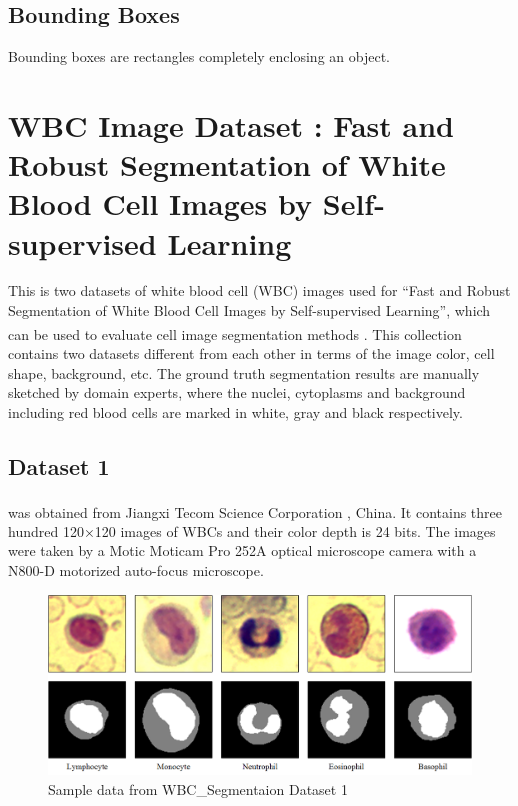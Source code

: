 \subsection{Bounding Boxes}
Bounding boxes are rectangles completely enclosing an object.

\newpage

\section{WBC Image Dataset : Fast and Robust Segmentation of White Blood Cell Images by Self-supervised Learning}
This is two datasets of white blood cell (WBC) images used for “Fast and Robust Segmentation of White Blood Cell Images by Self-supervised Learning”, which can be used to evaluate cell image segmentation methods \textsuperscript{\cite{Zheng2018}}.
This collection contains two datasets different from each other in terms of the image color, cell shape, background, etc. The ground truth segmentation results are manually sketched by domain experts, where the nuclei, cytoplasms and background including red blood cells are marked in white, gray and black respectively. 

\subsection{Dataset 1}
was obtained from Jiangxi Tecom Science Corporation \textsuperscript{\cite{2022_tecom-cn}}, China. It contains three hundred 120×120 images of WBCs and their color depth is 24 bits. The images were taken by a Motic Moticam Pro 252A optical microscope camera with a N800-D motorized auto-focus microscope.

\begin{figure}[H]
\centering
\includegraphics[width=\linewidth]{../images/WBC_Dataset1.png}
\caption{Sample data from WBC\_Segmentaion Dataset 1}
\label{fig:WBC_Dataset1_sample}
\end{figure}

